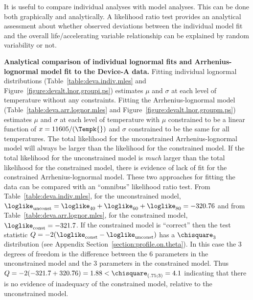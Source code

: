It is useful to compare individual analyses with model analyses.  This
can be done both graphically and analytically. A likelihood ratio test
provides an analytical assessment about whether observed deviations
between the individual model fit and the overall life/accelerating
variable relationship can be explained by random variability or not.
\begin{example}
{\bf Analytical comparison of individual lognormal fits
and Arrhenius-lognormal model fit to the Device-A data.} 
\label{example:devicea.model.lrt}
Fitting individual lognormal distributions
(Table~\ref{table:deva.indiv.mles} and
Figure~\ref{figure:devalt.lnor.groupi.ps}) estimates
$\mu$ and $\sigma$ at each level of temperature without any
constraints. Fitting the Arrhenius-lognormal model
(Table~\ref{table:deva.arr.lognor.mles} and
Figure~\ref{figure:devalt.lnor.groupm.ps}) estimates
$\mu$ and $\sigma$ at each level of temperature with $\mu$ constrained
to be a linear function of $x=11605/(\Tempk{})$ and $\sigma$
constrained to be the same for all temperatures.  The total likelihood
for the unconstrained Arrhenius-lognormal
model will always be larger than the likelihood for
the constrained model.  If the total likelihood for the unconstrained
model is {\em much} larger than the total likelihood for the
constrained model, there is evidence of lack of fit for the
constrained Arrhenius-lognormal model. These two approaches for fitting
the data can be compared with an ``omnibus'' likelihood ratio test.
From Table~\ref{table:deva.indiv.mles}, for the
unconstrained model, $\loglike_{\rm unconst}=\loglike_{40} +
\loglike_{60} + \loglike_{80} = -320.76$ and from
Table~\ref{table:deva.arr.lognor.mles}, for the constrained model,
$\loglike_{\rm const}= -321.7$.  If the constrained model is
``correct'' then the test statistic
$Q=-2(\loglike_{\rm const}-\loglike_{\rm unconst})$
has a $\chisquare_{3}$ distribution (see Appendix
Section~\ref{section:profile.on.theta}).  In this case the 3 degrees of
freedom is the difference between the 6 parameters in the
unconstrained model and the 3 parameters in the constrained model.
Thus $Q=-2(-321.7 +320.76) =1.88 <
\chisquare_{(.75;3)} =4.1$ indicating that there is no evidence of inadequacy of the constrained model, relative to the unconstrained
model.
\end{example}

